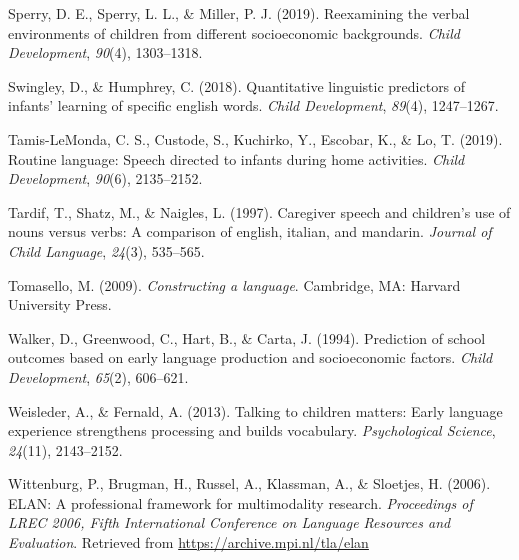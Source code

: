 \documentclass[
  man,floatsintext]{apa6}
\newlength{\cslhangindent}
\newlength{\cslentryspacingunit} %
\newenvironment{CSLReferences}[2] %
 {%
  \setlength{\parindent}{0pt}
  \ifodd #1
  \let\oldpar\par
  \def\par{\hangindent=\cslhangindent\oldpar}
  \fi
  \setlength{\parskip}{#2\cslentryspacingunit}
 }%
 {}
\begin{document}
\begin{CSLReferences}{1}{0}
\leavevmode{}%
Sperry, D. E., Sperry, L. L., \& Miller, P. J. (2019). Reexamining the verbal environments of children from different socioeconomic backgrounds. \emph{Child Development}, \emph{90}(4), 1303--1318.

\leavevmode{}%
Swingley, D., \& Humphrey, C. (2018). Quantitative linguistic predictors of infants' learning of specific english words. \emph{Child Development}, \emph{89}(4), 1247--1267.

\leavevmode{}%
Tamis-LeMonda, C. S., Custode, S., Kuchirko, Y., Escobar, K., \& Lo, T. (2019). Routine language: Speech directed to infants during home activities. \emph{Child Development}, \emph{90}(6), 2135--2152.

\leavevmode{}%
Tardif, T., Shatz, M., \& Naigles, L. (1997). Caregiver speech and children's use of nouns versus verbs: A comparison of english, italian, and mandarin. \emph{Journal of Child Language}, \emph{24}(3), 535--565.

\leavevmode{}%
Tomasello, M. (2009). \emph{Constructing a language}. Cambridge, MA: Harvard University Press.

\leavevmode{}%
Walker, D., Greenwood, C., Hart, B., \& Carta, J. (1994). Prediction of school outcomes based on early language production and socioeconomic factors. \emph{Child Development}, \emph{65}(2), 606--621.

\leavevmode{}%
Weisleder, A., \& Fernald, A. (2013). Talking to children matters: Early language experience strengthens processing and builds vocabulary. \emph{Psychological Science}, \emph{24}(11), 2143--2152.

\leavevmode{}%
Wittenburg, P., Brugman, H., Russel, A., Klassman, A., \& Sloetjes, H. (2006). {ELAN}: {A} professional framework for multimodality research. \emph{Proceedings of LREC 2006, Fifth International Conference on Language Resources and Evaluation}. Retrieved from \url{https://archive.mpi.nl/tla/elan}

\end{CSLReferences}
\end{document}
